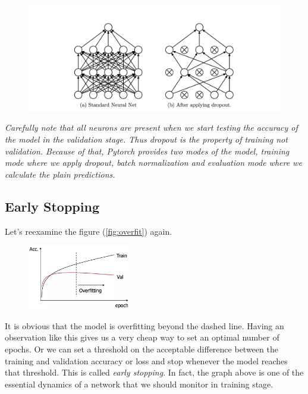 \documentclass[12pt]{article}
\begin{document}
\begin{figure}[H]
 \label{fig:drop}
  \centering
  \includegraphics[width=1\textwidth]{dropout.png}
\end{figure}
\textit{Carefully note that all neurons are present when we start testing the accuracy of the model in the validation stage. Thus dropout is the property of training not validation. Because of that, Pytorch provides two modes of the model, training mode where we apply dropout, batch normalization and evaluation mode where we calculate the plain predictions.}



\subsection{Early Stopping}
Let's reexamine the figure (\ref{fig:overfit}) again. 
\begin{figure}[H]
 \label{fig:overfit2}
  \centering
  \includegraphics[width=0.4\textwidth]{overfit.png}
\end{figure}
It is obvious that the model is overfitting beyond the dashed line. Having an observation like this gives us a very cheap way to set an optimal number of epochs. Or we can set a threshold on the acceptable difference between the training and validation accuracy or loss and stop whenever the model reaches that threshold. This is called \textit{early stopping}. In fact, the graph above is one of the essential dynamics of a network that we should monitor in training stage.

\end{document}
